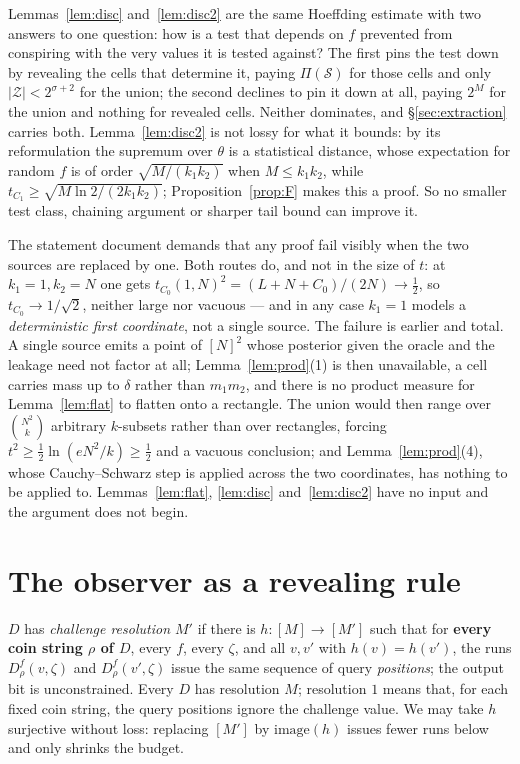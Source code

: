 \documentclass{aicr-solution}
\begin{document}
\begin{remark}\label{rem:one}
Lemmas~\ref{lem:disc} and~\ref{lem:disc2} are the same Hoeffding estimate with two
answers to one question: how is a test that depends on $f$ prevented from
conspiring with the very values it is tested against? The first pins the test down
by revealing the cells that determine it, paying $\Pi(\mathcal S)$ for those cells
and only $|\mathcal Z|<2^{\sigma+2}$ for the union; the second declines to pin it
down at all, paying $2^{M}$ for the union and nothing for revealed cells. Neither
dominates, and \S\ref{sec:extraction} carries both. Lemma~\ref{lem:disc2} is not
lossy for what it bounds: by its reformulation the supremum over $\theta$ is a
statistical distance, whose expectation for random $f$ is of order
$\sqrt{M/(k_1k_2)}$ when $M\le k_1k_2$, while
$t_{C_1}\ge\sqrt{M\ln2/(2k_1k_2)}$; Proposition~\ref{prop:F} makes this a proof.
So no smaller test class, chaining argument or sharper tail bound can improve it.

The statement document demands that any proof fail visibly when the two sources
are replaced by one. Both routes do, and not in the size of $t$: at $k_1=1,k_2=N$
one gets $t_{C_0}(1,N)^{2}=(L+N+C_0)/(2N)\to\tfrac12$, so $t_{C_0}\to1/\sqrt2$,
neither large nor vacuous --- and in any case $k_1=1$ models a \emph{deterministic
first coordinate}, not a single source. The failure is earlier and total. A single
source emits a point of $[N]^{2}$ whose posterior given the oracle and the leakage
need not factor at all; Lemma~\ref{lem:prod}(1) is then unavailable, a cell carries
mass up to $\delta$ rather than $m_1m_2$, and there is no product measure for
Lemma~\ref{lem:flat} to flatten onto a rectangle. The union would then range over
$\binom{N^{2}}{k}$ arbitrary $k$-subsets rather than over rectangles, forcing
$t^{2}\ge\frac12\ln(eN^{2}/k)\ge\frac12$ and a vacuous conclusion; and
Lemma~\ref{lem:prod}(4), whose Cauchy--Schwarz step is applied across the two
coordinates, has nothing to be applied to. Lemmas~\ref{lem:flat},
\ref{lem:disc} and~\ref{lem:disc2} have no input and the argument does not begin.
\end{remark}

\section{The observer as a revealing rule}

\begin{definition}\label{def:res}
$D$ has \emph{challenge resolution $M'$} if there is $h:[M]\to[M']$ such that for
\textbf{every coin string $\rho$ of $D$}, every $f$, every $\zeta$, and all
$v,v'$ with $h(v)=h(v')$, the runs $D^{f}_{\rho}(v,\zeta)$ and
$D^{f}_{\rho}(v',\zeta)$ issue the same sequence of query \emph{positions}; the
output bit is unconstrained. Every $D$ has resolution $M$; resolution $1$ means
that, for each fixed coin string, the query positions ignore the challenge value.
We may take $h$ surjective without loss: replacing $[M']$ by $\mathrm{image}(h)$
issues fewer runs below and only shrinks the budget.
\end{definition}
\end{document}

